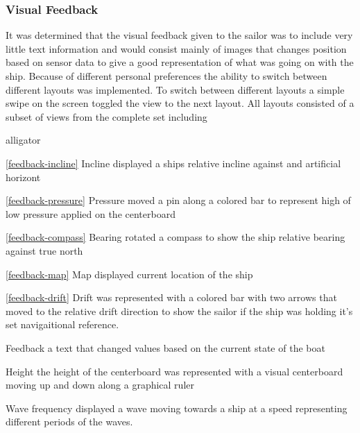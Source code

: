 \subsubsection{Visual Feedback}
It was determined that the visual feedback given to the sailor was to include very little text information and would consist mainly of images that changes position based on sensor data to give a good representation of what was going on with the ship. Because of different personal preferences the ability to switch between different layouts was implemented. To switch between different layouts a simple swipe on the screen toggled the view to the next layout. All layouts consisted of a subset of views from the complete set including
\begin{labeling}{alligator}
\item [\ref{feedback-incline} Incline]  displayed a ships relative incline against and artificial horizont
\item [\ref{feedback-pressure} Pressure] moved a pin along a colored bar to represent high of low pressure applied on the centerboard
\item [\ref{feedback-compass} Bearing] rotated a compass to show the ship relative bearing against true north
\item [\ref{feedback-map} Map] displayed current location of the ship
\item [\ref{feedback-drift} Drift] was represented with a colored bar with two arrows that moved to the relative drift direction to show the sailor if the ship was holding it's set navigaitional reference.
\item [Feedback] a text that changed values based on the current state of the boat
\item [Height] the height of the centerboard was represented with a visual centerboard moving up and down along a graphical ruler
\item [Wave frequency] displayed a wave moving towards a ship at a speed representing different periods of the waves.
\end{labeling}

